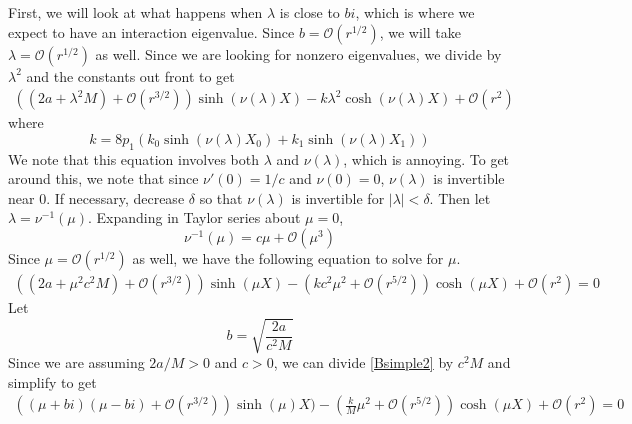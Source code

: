 \documentclass[thesis.tex]{subfiles}
\begin{document}
First, we will look at what happens when $\lambda$ is close to $bi$, which is where we expect to have an interaction eigenvalue. Since $b = \mathcal{O}(r^{1/2})$, we will take $\lambda = \mathcal{O}(r^{1/2})$ as well. Since we are looking for nonzero eigenvalues, we divide by $\lambda^2$ and the constants out front to get
\begin{equation}\label{Bsimple1}
\begin{aligned}
\left((2a + \lambda^2 M) +  \mathcal{O}( r^{3/2} )\right) \sinh(\nu(\lambda)X) - k \lambda^2 \cosh(\nu(\lambda)X)+ \mathcal{O}( r^2 ) 
\end{aligned}
\end{equation}
where
\begin{equation}\label{2pdefk}
k = 8 p_1 ( k_0\sinh(\nu(\lambda)X_0) + k_1 \sinh(\nu(\lambda)X_1) ) 
\end{equation}
We note that this equation involves both $\lambda$ and $\nu(\lambda)$, which is annoying. To get around this, we note that since $\nu'(0) = 1/c$ and $\nu(0) = 0$, $\nu(\lambda)$ is invertible near 0. If necessary, decrease $\delta$ so that $\nu(\lambda)$ is invertible for $|\lambda| < \delta$. Then let $\lambda = \nu^{-1}(\mu)$. Expanding in Taylor series about $\mu = 0$, 
\[
\nu^{-1}(\mu) = c \mu + \mathcal{O}(\mu^3)
\]
Since $\mu = \mathcal{O}(r^{1/2})$ as well, we have the following equation to solve for $\mu$.
\begin{equation}\label{Bsimple2}
\begin{aligned}
\left((2a + \mu^2 c^2 M) +  \mathcal{O}( r^{3/2} )\right) \sinh(\mu X) - \left(k c^2 \mu^2 + \mathcal{O}( r^{5/2} ) \right)\cosh(\mu X)+ \mathcal{O}( r^2 ) = 0
\end{aligned}
\end{equation}
Let
\[
b = \sqrt{\frac{2a}{c^2 M}}
\]
Since we are assuming $2a/M > 0$ and $c>0$, we can divide \cref{Bsimple2} by $c^2 M$ and simplify to get
\begin{equation}\label{Bsimple2}
\begin{aligned}
\left((\mu + b i)(\mu - b i) +  \mathcal{O}( r^{3/2} )\right) \sinh(\mu )X) - \left(\frac{k}{M} \mu^2 + \mathcal{O}( r^{5/2} ) \right)\cosh(\mu X)+ \mathcal{O}( r^2 ) = 0
\end{aligned}
\end{equation}
\end{document}
